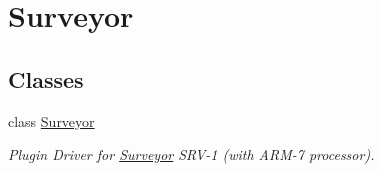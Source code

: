 \hypertarget{group__driver__surveyor}{
\section{Surveyor}
\label{group__driver__surveyor}
}
\subsection*{Classes}
\begin{CompactItemize}
\item 
class \hyperlink{classSurveyor}{Surveyor}
\begin{CompactList}\small\item\em Plugin Driver for \hyperlink{classSurveyor}{Surveyor} SRV-1 (with ARM-7 processor). \item\end{CompactList}\end{CompactItemize}

